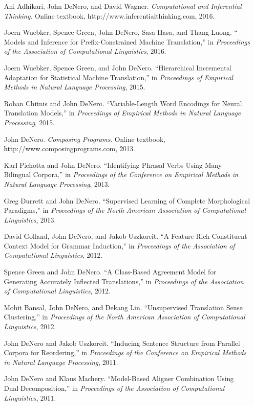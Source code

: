 \documentclass[margin,line]{res}
\begin{document}
\begin{resume}
Ani Adhikari, John DeNero, and David Wagner. {\it Computational and Inferential Thinking.} Online textbook, http://www.inferentialthinking.com, 2016.

Joern Wuebker, Spence Green, John DeNero, Sasa Hasa, and Thang Luong. `` Models and Inference for Prefix-Constrained Machine Translation,'' in {\it Proceedings of the Association of Computational Linguistics}, 2016.

Joern Wuebker, Spence Green, and John DeNero. ``Hierarchical Incremental Adaptation for Statistical Machine Translation,'' in {\it Proceedings of Empirical Methods in Natural Language Processing}, 2015.

Rohan Chitnis and John DeNero. ``Variable-Length Word Encodings for Neural Translation Models,'' in {\it Proceedings of Empirical Methods in Natural Language Processing}, 2015.

John DeNero. {\it Composing Programs.} Online textbook, http://www.composingprograms.com, 2013.

Karl Pichotta and John DeNero.  ``Identifying Phrasal Verbs Using Many Bilingual Corpora,'' in {\it Proceedings of the Conference on Empirical Methods in Natural Language Processing}, 2013.

Greg Durrett and John DeNero.  ``Supervised Learning of Complete Morphological Paradigms,'' in {\it Proceedings of the North American Association of Computational Linguistics}, 2013.

David Golland, John DeNero, and Jakob Uszkoreit. ``A Feature-Rich Constituent Context Model for Grammar Induction,'' in {\it Proceedings of the Association of Computational Linguistics}, 2012.

Spence Green and John DeNero. ``A Class-Based Agreement Model for Generating Accurately Inflected Translations,'' in {\it Proceedings of the Association of Computational Linguistics}, 2012.

Mohit Bansal, John DeNero, and Dekang Lin. ``Unsupervised Translation Sense Clustering,'' in {\it Proceedings of the North American Association of Computational Linguistics}, 2012.

John DeNero and Jakob Uszkoreit.  ``Inducing Sentence Structure from Parallel Corpora for Reordering,'' in {\it Proceedings of the Conference on Empirical Methods in Natural Language Processing}, 2011.

John DeNero and Klaus Machery. ``Model-Based Aligner Combination Using Dual Decomposition,'' in {\it Proceedings of the Association of Computational Linguistics}, 2011.


\end{resume}
\end{document}
